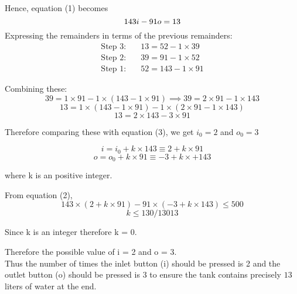 \documentclass[11pt]{article}
\begin{document}
{\begin{minipage}{0.98\linewidth}
        \vspace{-1.25em}
        Hence, equation (1) becomes \vspace{-0.5em}
        \begin{equation}
            143i - 91o = 13 \vspace{-0.5em}
        \end{equation} \vspace{-1em}
        Expressing the remainders in terms of the previous remainders:
        \begin{align*}
            \text{Step 3:} & \quad 13 = 52 - 1 \times 39 \\
            \text{Step 2:} & \quad 39 = 91 - 1 \times 52 \\
            \text{Step 1:} & \quad 52 = 143 - 1 \times 91 
        \end{align*}

        \vspace{-1.25em}
        Combining these: \vspace{-1.15em}
        $$ 39 = 1 \times 91 - 1 \times (143 - 1 \times 91) \implies 39 = 2 \times 91 - 1 \times 143 $$ \vspace{-2em}
        $$ 13 = 1 \times (143 - 1 \times 91) - 1 \times (2 \times 91 - 1 \times 143)$$ \vspace{-1.75em}
        $$ 13 = 2 \times 143 - 3 \times 91 $$ 
        
        \vspace{-0.5em}
        Therefore comparing these with equation (3), we get $i_0 = 2$ and $o_0 = 3$ \vspace{-1em}
        
        $$ i = i_0 + k \times 143 \equiv 2 + k \times 91$$ \vspace{-1.75em}
        $$ o = o_0 + k \times 91 \equiv -3 + k \times + 143$$ 
        
        \vspace{-0.75em}
        where k is an positive integer. 
        
        From equation (2), \vspace{-0.5em}
        $$ 143 \times (2 + k \times 91) - 91 \times (-3 + k \times 143) \leq 500 $$ 
        \vspace{-1.75em}
        $$ k \leq 130 / 13013 $$

        Since k is an integer therefore k = 0.

        Therefore the possible value of i = 2 and o = 3. \\

        Thus the number of times the inlet button (i) should be pressed is 2 and the outlet button (o) should be pressed is 3 to ensure the tank contains precisely $13$ liters of water at the end.
    \end{minipage}
}
\end{document}
